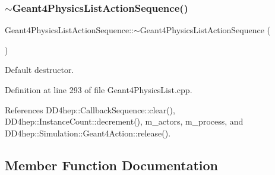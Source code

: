 \hypertarget{class_d_d4hep_1_1_simulation_1_1_geant4_physics_list_action_sequence_a2b2989ac26194d0579cf02256fbe70f8}{}\label{class_d_d4hep_1_1_simulation_1_1_geant4_physics_list_action_sequence_a2b2989ac26194d0579cf02256fbe70f8} 
\subsubsection{\texorpdfstring{$\sim$\+Geant4\+Physics\+List\+Action\+Sequence()}{~Geant4PhysicsListActionSequence()}}
{\footnotesize\ttfamily Geant4\+Physics\+List\+Action\+Sequence\+::$\sim$\+Geant4\+Physics\+List\+Action\+Sequence (\begin{DoxyParamCaption}{ }\end{DoxyParamCaption})\hspace{0.3cm}{\ttfamily [virtual]}}



Default destructor. 



Definition at line 293 of file Geant4\+Physics\+List.\+cpp.



References D\+D4hep\+::\+Callback\+Sequence\+::clear(), D\+D4hep\+::\+Instance\+Count\+::decrement(), m\+\_\+actors, m\+\_\+process, and D\+D4hep\+::\+Simulation\+::\+Geant4\+Action\+::release().



\subsection{Member Function Documentation}
\hypertarget{class_d_d4hep_1_1_simulation_1_1_geant4_physics_list_action_sequence_a142dc8e16755a619d103c295b7e6445b}{}\label{class_d_d4hep_1_1_simulation_1_1_geant4_physics_list_action_sequence_a142dc8e16755a619d103c295b7e6445b} 
